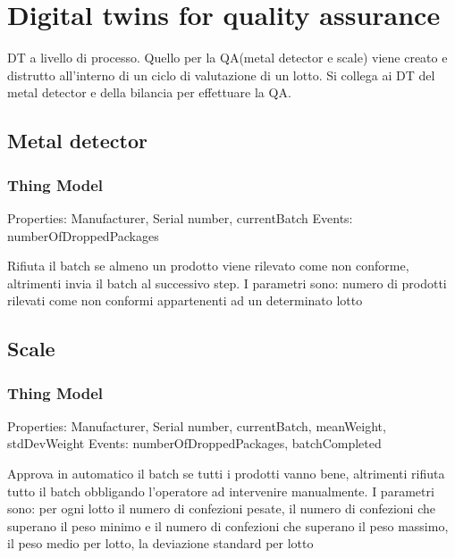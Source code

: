 \section{Digital twins for quality assurance}
DT a livello di processo. Quello per la QA(metal detector e scale) viene creato e distrutto all'interno di un ciclo di valutazione di un lotto.
Si collega ai DT del metal detector e della bilancia per effettuare la QA.
\subsection{Metal detector}
\subsubsection{Thing Model}
Properties: Manufacturer, Serial number, currentBatch
Events: numberOfDroppedPackages

Rifiuta il batch se almeno un prodotto viene rilevato come non conforme, altrimenti invia il batch al successivo step.
I parametri sono:
numero di prodotti rilevati come non conformi appartenenti ad un determinato lotto

\subsection{Scale}

\subsubsection{Thing Model}
Properties: Manufacturer, Serial number, currentBatch, meanWeight, stdDevWeight
Events: numberOfDroppedPackages, batchCompleted

Approva in automatico il batch se tutti i prodotti vanno bene, altrimenti rifiuta tutto il batch obbligando l'operatore ad intervenire manualmente.
I parametri sono:
per ogni lotto il numero di confezioni pesate, il numero di confezioni che superano il peso minimo e il numero di confezioni che superano il peso massimo, il peso medio per lotto, la deviazione standard per lotto
